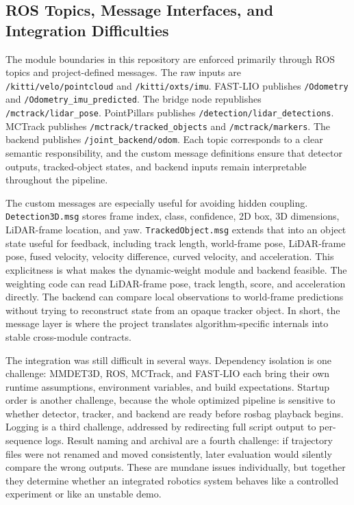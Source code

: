 \documentclass[a4paper,12pt]{article}
\newcommand{\code}[1]{\nolinkurl{#1}}
\begin{document}
\subsection{ROS Topics, Message Interfaces, and Integration Difficulties}
The module boundaries in this repository are enforced primarily through ROS topics and project-defined messages. The raw inputs are \code{/kitti/velo/pointcloud} and \code{/kitti/oxts/imu}. FAST-LIO publishes \code{/Odometry} and \code{/Odometry_imu_predicted}. The bridge node republishes \code{/mctrack/lidar_pose}. PointPillars publishes \code{/detection/lidar_detections}. MCTrack publishes \code{/mctrack/tracked_objects} and \code{/mctrack/markers}. The backend publishes \code{/joint_backend/odom}. Each topic corresponds to a clear semantic responsibility, and the custom message definitions ensure that detector outputs, tracked-object states, and backend inputs remain interpretable throughout the pipeline.

The custom messages are especially useful for avoiding hidden coupling. \code{Detection3D.msg} stores frame index, class, confidence, 2D box, 3D dimensions, LiDAR-frame location, and yaw. \code{TrackedObject.msg} extends that into an object state useful for feedback, including track length, world-frame pose, LiDAR-frame pose, fused velocity, velocity difference, curved velocity, and acceleration. This explicitness is what makes the dynamic-weight module and backend feasible. The weighting code can read LiDAR-frame pose, track length, score, and acceleration directly. The backend can compare local observations to world-frame predictions without trying to reconstruct state from an opaque tracker object. In short, the message layer is where the project translates algorithm-specific internals into stable cross-module contracts.

The integration was still difficult in several ways. Dependency isolation is one challenge: MMDET3D, ROS, MCTrack, and FAST-LIO each bring their own runtime assumptions, environment variables, and build expectations. Startup order is another challenge, because the whole optimized pipeline is sensitive to whether detector, tracker, and backend are ready before rosbag playback begins. Logging is a third challenge, addressed by redirecting full script output to per-sequence logs. Result naming and archival are a fourth challenge: if trajectory files were not renamed and moved consistently, later evaluation would silently compare the wrong outputs. These are mundane issues individually, but together they determine whether an integrated robotics system behaves like a controlled experiment or like an unstable demo.
\end{document}
